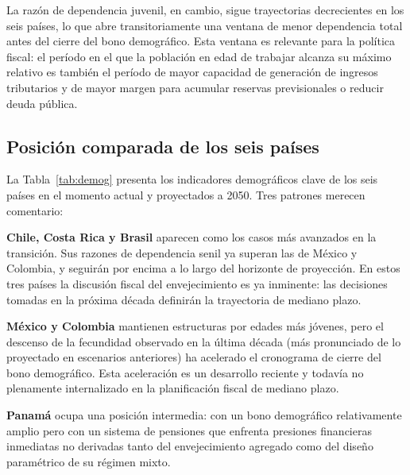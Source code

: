 \documentclass[12pt, letterpaper]{article}
\begin{document}
La razón de dependencia juvenil, en cambio, sigue trayectorias decrecientes en los
seis países, lo que abre transitoriamente una ventana de menor dependencia total
antes del cierre del bono demográfico. Esta ventana es relevante para la política
fiscal: el período en el que la población en edad de trabajar alcanza su máximo
relativo es también el período de mayor capacidad de generación de ingresos
tributarios y de mayor margen para acumular reservas previsionales o reducir deuda
pública.

\subsection{Posición comparada de los seis países}

La Tabla~\ref{tab:demog} presenta los indicadores demográficos clave de los seis
países en el momento actual y proyectados a 2050. Tres patrones merecen comentario:

\textbf{Chile, Costa Rica y Brasil} aparecen como los casos más avanzados en la
transición. Sus razones de dependencia senil ya superan las de México y Colombia, y
seguirán por encima a lo largo del horizonte de proyección. En estos tres países la
discusión fiscal del envejecimiento es ya inminente: las decisiones tomadas en la
próxima década definirán la trayectoria de mediano plazo.

\textbf{México y Colombia} mantienen estructuras por edades más jóvenes, pero el
descenso de la fecundidad observado en la última década (más pronunciado de lo
proyectado en escenarios anteriores) ha acelerado el cronograma de cierre del bono
demográfico. Esta aceleración es un desarrollo reciente y todavía no plenamente
internalizado en la planificación fiscal de mediano plazo.

\textbf{Panamá} ocupa una posición intermedia: con un bono demográfico relativamente
amplio pero con un sistema de pensiones que enfrenta presiones financieras
inmediatas no derivadas tanto del envejecimiento agregado como del diseño
paramétrico de su régimen mixto.
\end{document}
